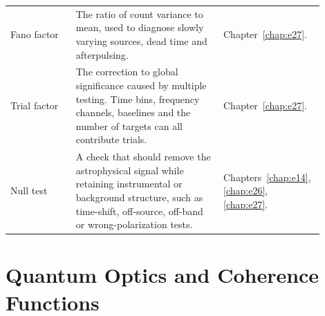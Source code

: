 \begin{longtable}{p{0.20\linewidth}p{0.45\linewidth}p{0.25\linewidth}}
Fano factor & The ratio of count variance to mean, used to diagnose slowly varying sources, dead time and afterpulsing. & Chapter~\ref{chap:e27}. \\
Trial factor & The correction to global significance caused by multiple testing. Time bins, frequency channels, baselines and the number of targets can all contribute trials. & Chapter~\ref{chap:e27}. \\
Null test & A check that should remove the astrophysical signal while retaining instrumental or background structure, such as time-shift, off-source, off-band or wrong-polarization tests. & Chapters~\ref{chap:e14}, \ref{chap:e26}, \ref{chap:e27}. \\
\bottomrule
\end{longtable}

\section{Quantum Optics and Coherence Functions}
\label{appsec:c-optics}

